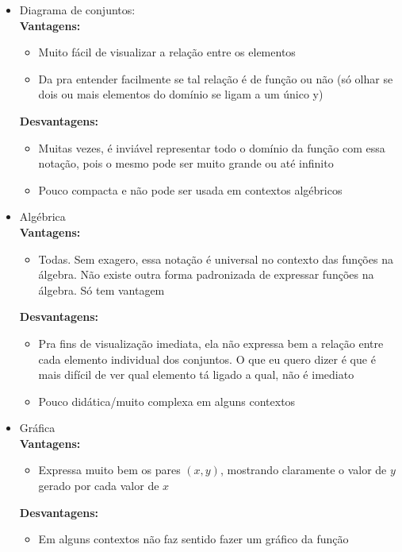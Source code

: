 \documentclass{article}
\begin{document}
\begin{itemize}
    \item Diagrama de conjuntos:
    \\[2pt]
    \textbf{Vantagens:}
    \begin{itemize}
        \item Muito fácil de visualizar a relação entre os elementos

        \item Da pra entender facilmente se tal relação é de função ou não (só olhar se dois ou mais elementos do domínio se ligam a um único y)  
    \end{itemize}
    \textbf{Desvantagens:}
    \begin{itemize}
        \item Muitas vezes, é inviável representar todo o domínio da função com essa notação, pois o mesmo pode ser muito grande ou até infinito

        \item Pouco compacta e não pode ser usada em contextos algébricos
    \end{itemize}

    \item Algébrica
    \\[2pt]
    \textbf{Vantagens:}
    \begin{itemize}
        \item Todas. Sem exagero, essa notação é universal no contexto das funções na álgebra. Não existe outra forma padronizada de expressar funções na álgebra. Só tem vantagem
    \end{itemize}
    \textbf{Desvantagens:}
    \begin{itemize}
        \item Pra fins de visualização imediata, ela não expressa bem a relação entre cada elemento individual dos conjuntos. O que eu quero dizer é que é mais difícil de ver qual elemento tá ligado a qual, não é imediato

        \item Pouco didática/muito complexa em alguns contextos
    \end{itemize}

    \item Gráfica
    \\[2pt]
    \textbf{Vantagens:}
    \begin{itemize}
        \item Expressa muito bem os pares $(x, y)$, mostrando claramente o valor de $y$ gerado por cada valor de $x$
    \end{itemize}
    \textbf{Desvantagens:}
    \begin{itemize}
        \item Em alguns contextos não faz sentido fazer um gráfico da função
    \end{itemize}
\end{itemize}
\end{document}
